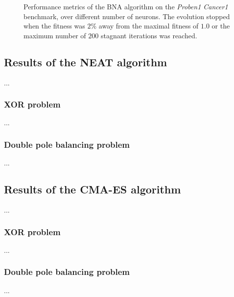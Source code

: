 \begin{figure}
\begin{center}
    \end{center}
    \caption{Performance metrics of the BNA algorithm on the \textit{Proben1 Cancer1} benchmark, over different number of neurons.
    The evolution stopped when the fitness was $2\%$ away from the maximal fitness of $1.0$ or the maximum number of $200$ stagnant iterations was reached.}
    \label{fig:bna_proben1}
\end{figure}

\subsection{Results of the NEAT algorithm}

...

\subsubsection{XOR problem}

...

\subsubsection{Double pole balancing problem}

...

\subsection{Results of the CMA-ES algorithm}

...

\subsubsection{XOR problem}

...

\subsubsection{Double pole balancing problem}

...
